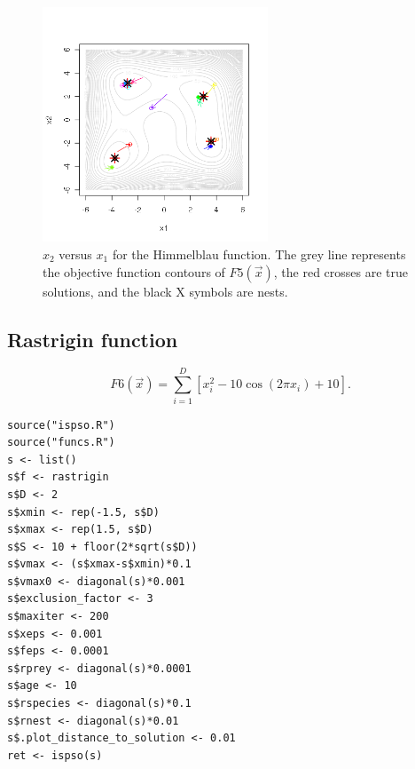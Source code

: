 \documentclass{article}
\begin{document}
\begin{figure}[htbp]
  \centering
  \includegraphics[width=0.6\textwidth]{himmelblau.png}
  \caption{$x_2$ versus $x_1$ for the Himmelblau function. The grey line represents the objective function contours of $F5(\vec{x})$, the red crosses are true solutions, and the black X symbols are nests.}
\end{figure}

\subsection{Rastrigin function}

\begin{equation*}
  F6(\vec{x})=\sum_{i=1}^D\left[x_i^2-10\cos(2\pi x_i)+10\right].
\end{equation*}

\begin{verbatim}
source("ispso.R")
source("funcs.R")
s <- list()
s$f <- rastrigin
s$D <- 2
s$xmin <- rep(-1.5, s$D)
s$xmax <- rep(1.5, s$D)
s$S <- 10 + floor(2*sqrt(s$D))
s$vmax <- (s$xmax-s$xmin)*0.1
s$vmax0 <- diagonal(s)*0.001
s$exclusion_factor <- 3
s$maxiter <- 200
s$xeps <- 0.001
s$feps <- 0.0001
s$rprey <- diagonal(s)*0.0001
s$age <- 10
s$rspecies <- diagonal(s)*0.1
s$rnest <- diagonal(s)*0.01
s$.plot_distance_to_solution <- 0.01
ret <- ispso(s)
\end{verbatim}
\end{document}
